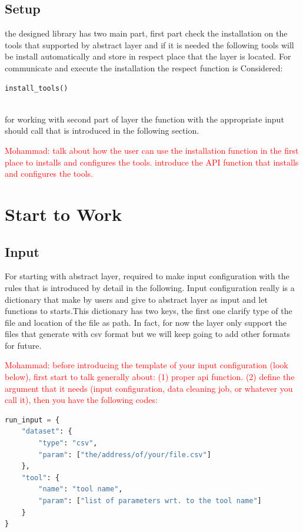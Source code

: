 \documentclass[12pt]{article}
\newcommand{\mohammad}[1]{\textcolor{red}{Mohammad: #1}}
\begin{document}
\subsection{Setup}
the designed library has two main part, first part check the installation on the tools that supported by abstract layer and if it is needed the following tools will be install automatically and store in respect place that the layer is located.
For communicate and execute the installation the respect function is Considered:
\begin{lstlisting}
install_tools()
	
\end{lstlisting}
for working with second part of layer the function with the appropriate input should call that is introduced in the following section.
   
\mohammad{talk about how the user can use the installation function in the first place to installs and configures the tools. introduce the API function that installs and configures the tools.}


\section{Start to Work}

\subsection{Input}
For starting with abstract layer, required to make input configuration with the rules that is introduced by detail in the following.
Input configuration really is a dictionary that make by users and give to abstract layer as input and let functions to starts.This dictionary has two keys, the first one clarify type of the file and location of the file as path. In fact, for now the layer only support the files that generate with csv format but we will keep going to add other formats for future.
 
\mohammad{before introducing the template of your input configuration (look below), first start to talk generally about: (1) proper api function. (2) define the argument that it needs (input configuration, data cleaning job, or whatever you call it), then you have the following codes:}
\begin{lstlisting}[language=Python]
run_input = {
	"dataset": {
		"type": "csv",
		"param": ["the/address/of/your/file.csv"]
	},
	"tool": {
		"name": "tool name",
		"param": ["list of parameters wrt. to the tool name"]
	}
}
\end{lstlisting}
\end{document}
